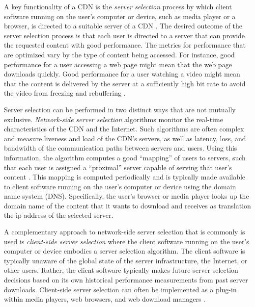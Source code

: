 \documentclass[conference]{IEEEtran}
\begin{document}
A key functionality of a CDN is the {\em server selection} process by which client software running on the user's computer or device, such as media player or a browser, is directed to a suitable server of a CDN \cite{dilley2002globally}.  The desired outcome of the server selection process is that each user is directed to a server that can provide the requested content with good performance. The metrics for performance that are optimized vary by the type of content being accessed. For instance, good performance for a user accessing a web page might mean that the web page downloads quickly. Good performance for a user watching a video might mean that the content is delivered by the server at a sufficiently high bit rate to avoid the video from freezing and rebuffering \cite{KrishnanS12}.

Server selection can be performed in two distinct ways that are not mutually exclusive. {\em Network-side server selection} algorithms monitor the real-time characteristics of the CDN and the Internet. Such algorithms are often complex and measure liveness and load of the CDN's servers, as well as latency, loss, and bandwidth of the communication paths between servers and users. Using this information, the algorithm computes a good ``mapping'' of users to servers, such that each user is assigned a ``proximal'' server capable of serving that user's content \cite{nygren2010akamai}. This mapping is computed periodically and is typically made available to client software running on the user's computer or device using the domain name system (DNS). Specifically, the user's browser or media player looks up the domain name of the content that it wants to download and receives as translation the ip address of the selected server.
 
A complementary approach to network-side server selection that is commonly is used is {\em client-side server selection} where the client software running on the user's computer or device embodies a server selection algorithm. The client software is typically unaware of the global state of the server infrastructure, the Internet, or other users. Rather, the client software typically makes future server selection decisions based on its own historical performance measurements from past server downloads. Client-side server selection can often be implemented as a plug-in within media players,  web browsers, and web download managers \cite{AkamaiDLM}.  
 
\end{document}

